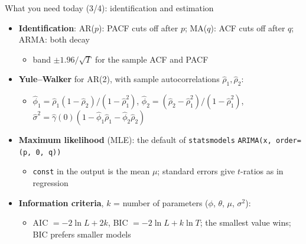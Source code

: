 \begin{frame}{What you need today (3/4): identification and estimation}
\itemsize{\small}
\begin{itemize}
    \item \textbf{Identification}: AR($p$): PACF cuts off after $p$; MA($q$): ACF cuts off after $q$; ARMA: both decay
    \begin{itemize}
        \item band $\pm 1.96/\sqrt{T}$ for the sample ACF and PACF
    \end{itemize}
    \item \textbf{Yule--Walker} for AR(2), with sample autocorrelations $\hat\rho_1, \hat\rho_2$:
    \begin{itemize}
        \item $\hat\phi_1 = \hat\rho_1(1 - \hat\rho_2)/(1 - \hat\rho_1^2)$, $\hat\phi_2 = (\hat\rho_2 - \hat\rho_1^2)/(1 - \hat\rho_1^2)$, $\hat\sigma^2 = \hat\gamma(0)(1 - \hat\phi_1\hat\rho_1 - \hat\phi_2\hat\rho_2)$
    \end{itemize}
    \item \textbf{Maximum likelihood} (MLE): the default of \texttt{statsmodels} \texttt{ARIMA(x, order=(p, 0, q))}
    \begin{itemize}
        \item \texttt{const} in the output is the mean $\mu$; standard errors give $t$-ratios as in regression
    \end{itemize}
    \item \textbf{Information criteria}, $k$ = number of parameters ($\phi$, $\theta$, $\mu$, $\sigma^2$):
    \begin{itemize}
        \item AIC $= -2\ln L + 2k$, BIC $= -2\ln L + k\ln T$; the smallest value wins; BIC prefers smaller models
    \end{itemize}
\end{itemize}
\end{frame}

